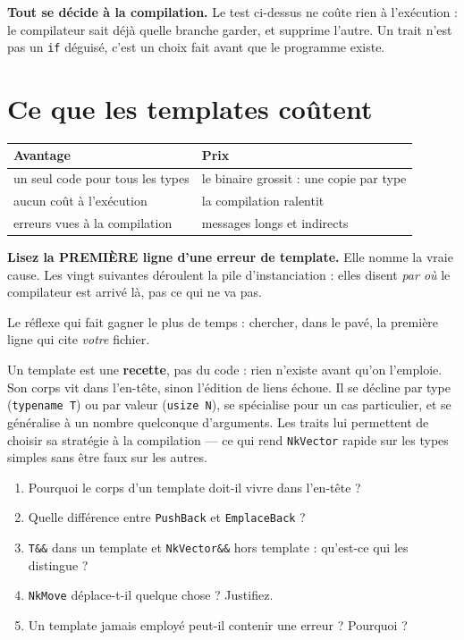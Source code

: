 \begin{nkretenir}
\textbf{Tout se décide à la compilation.} Le test ci-dessus ne coûte rien à
l'exécution : le compilateur sait déjà quelle branche garder, et supprime
l'autre. Un trait n'est pas un \texttt{if} déguisé, c'est un choix fait avant que
le programme existe.
\end{nkretenir}

\section{Ce que les templates coûtent}

\begin{center}
\begin{tabular}{@{}ll@{}}
\toprule
\textbf{Avantage} & \textbf{Prix} \\
\midrule
un seul code pour tous les types & le binaire grossit : une copie par type \\
aucun coût à l'exécution & la compilation ralentit \\
erreurs vues à la compilation & messages longs et indirects \\
\bottomrule
\end{tabular}
\end{center}

\begin{nkpiege}
\textbf{Lisez la PREMIÈRE ligne d'une erreur de template.} Elle nomme la vraie
cause. Les vingt suivantes déroulent la pile d'instanciation : elles disent
\emph{par où} le compilateur est arrivé là, pas ce qui ne va pas.

Le réflexe qui fait gagner le plus de temps : chercher, dans le pavé, la
première ligne qui cite \emph{votre} fichier.
\end{nkpiege}

\begin{nkbilan}
Un template est une \textbf{recette}, pas du code : rien n'existe avant qu'on
l'emploie. Son corps vit dans l'en-tête, sinon l'édition de liens échoue. Il se
décline par type (\texttt{typename T}) ou par valeur (\texttt{usize N}), se
spécialise pour un cas particulier, et se généralise à un nombre quelconque
d'arguments. Les traits lui permettent de choisir sa stratégie à la compilation
--- ce qui rend \texttt{NkVector} rapide sur les types simples sans être faux sur
les autres.
\end{nkbilan}

\begin{nkquestions}
\begin{enumerate}
\item Pourquoi le corps d'un template doit-il vivre dans l'en-tête ?
\item Quelle différence entre \texttt{PushBack} et \texttt{EmplaceBack} ?
\item \texttt{T\&\&} dans un template et \texttt{NkVector\&\&} hors template :
      qu'est-ce qui les distingue ?
\item \texttt{NkMove} déplace-t-il quelque chose ? Justifiez.
\item Un template jamais employé peut-il contenir une erreur ? Pourquoi ?
\end{enumerate}
\end{nkquestions}

